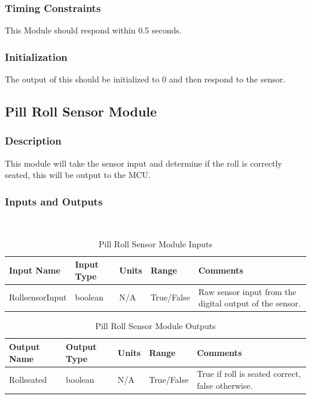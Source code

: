 \documentclass[12pt,titlepage]{article}
\begin{document}
\subsubsection*{Timing Constraints}
This Module should respond within 0.5 seconds.
\subsubsection*{Initialization}
The output of this should be initialized to 0 and then respond to the sensor.

\subsection{Pill Roll Sensor Module}
\subsubsection*{Description}
This module will take the sensor input and determine if the roll is correctly seated, this will be output to the MCU.
\subsubsection*{Inputs and Outputs}
$ $\\
\begin{table}[ht!]
\begin{center}
\begin{adjustbox}{max width=\textwidth}
\small
\begin{tabular}{|p{}|p{}|p{}|p{}|p{}|}
 \hline
 \textbf{Input Name} & \textbf{Input Type} & \textbf{Units} &\textbf{Range} & \textbf{Comments} \\
 \hline 
 RollsensorInput & boolean  & N/A & True/False & Raw sensor input from the digital output of the sensor. \\
 \hline
\end{tabular}
\end{adjustbox}
\end{center}
\caption{Pill Roll Sensor Module Inputs}
\end{table}

\begin{table}[ht!]
\begin{center}
\begin{adjustbox}{max width=\textwidth}
\small
\begin{tabular}{|p{}|p{}|p{}|p{}|p{}|}
 \hline
 \textbf{Output Name} & \textbf{Output Type} & \textbf{Units} &\textbf{Range} & \textbf{Comments} \\
 \hline 
 Rollseated & boolean & N/A & True/False & True if roll is seated correct, false otherwise. \\
 \hline
\end{tabular}
\end{adjustbox}
\end{center}
\caption{Pill Roll Sensor Module Outputs}
\end{table}
\end{document}
